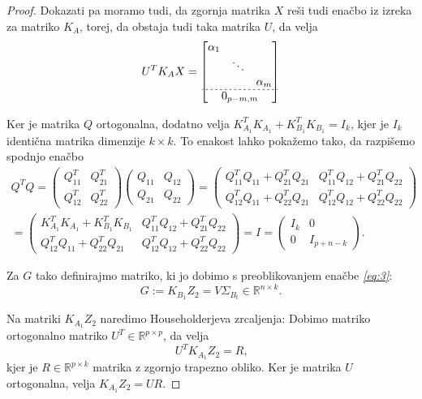 \documentclass[mat1]{article}
\begin{document}
\begin{proof}
Dokazati pa moramo tudi, da zgornja matrika $X$ reši tudi enačbo iz izreka za matriko $K_A$, torej, da obstaja tudi taka matrika $U$, da velja
\begin{gather*}
 U^T K_A X = 
\begin{bmatrix}
\begin{matrix}
\alpha_1 & & \\
 & \ddots & \\
 & & \alpha_m
\end{matrix} \\ \hdashline[2pt/2pt]
0_{p-m, m}
\end{bmatrix} 
\end{gather*}

Ker je matrika $Q$ ortogonalna, dodatno velja $K_{A_1}^TK_{A_1} + K_{B_1}^TK_{B_1} = I_k$, kjer je $I_k$ identična matrika dimenzije $k \times k$. To enakost lahko pokažemo tako, da razpišemo spodnjo enačbo
\begin{gather*}
Q^T Q = 
\begin{pmatrix}
Q_{11}^T & Q_{21}^T \\ 
Q_{12}^T & Q_{22}^T
\end{pmatrix}
\begin{pmatrix}
Q_{11} & Q_{12} \\ 
Q_{21} & Q_{22}
\end{pmatrix} =
\begin{pmatrix}
Q_{11}^T Q_{11} + Q_{21}^T Q_{21} & Q_{11}^T Q_{12} + Q_{21}^T Q_{22} \\ 
Q_{12}^T Q_{11} + Q_{22}^T Q_{21} & Q_{12}^T Q_{12} + Q_{22}^T Q_{22}
\end{pmatrix} \\ =
\begin{pmatrix}
K_{A_1}^TK_{A_1} + K_{B_1}^TK_{B_1} & Q_{11}^T Q_{12} + Q_{21}^T Q_{22} \\ 
Q_{12}^T Q_{11} + Q_{22}^T Q_{21} & Q_{12}^T Q_{12} + Q_{22}^T Q_{22}
\end{pmatrix}  = I =
\begin{pmatrix}
I_k & 0\\ 
0 & I_{p+n-k}
\end{pmatrix} \text{.}
\end{gather*}

Za $G$ tako definirajmo matriko, ki jo dobimo s preoblikovanjem enačbe \textit{\eqref{eq:3}}:
$$ G := K_{B_1} Z_2 = V \Sigma_{B_t} \in \mathbb{R}^{n \times k} \text{.}
$$

Na matriki $K_{A_1} Z_2$ naredimo Householderjeva zrcaljenja: Dobimo matriko ortogonalno matriko $U^T \in \mathbb{R}^{p \times p}$, da velja
$$ U^T K_{A_1} Z_2 = R \text{,}
$$
kjer je $R \in \mathbb{R}^{p \times k}$ matrika z zgornjo trapezno obliko. Ker je matrika $U$ ortogonalna, velja $ K_{A_1} Z_2 = U R$.


\end{proof}
\end{document}
